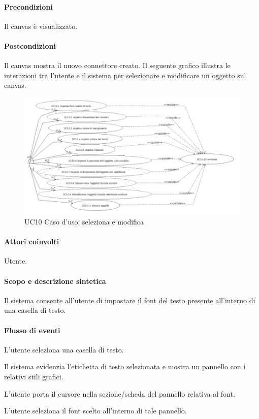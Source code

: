 \paragraph{Precondizioni} Il canvas \`e visualizzato.
\paragraph{Postcondizioni} Il canvas mostra il nuovo connettore creato.
\newpage
{}
\label{ucselezionaemodifica}
Il seguente grafico illustra le interazioni tra l'utente e il sistema per selezionare e modificare un oggetto sul canvas.

\begin{figure}[!ht]
\centering
\vspace{20pt} 
\includegraphics{UC10Espanso}
\caption{UC10 Caso d'uso: seleziona e modifica}
\label{uc10}
\end{figure}
\newpage
{}
\paragraph{Attori coinvolti} Utente.
\paragraph{Scopo e descrizione sintetica} 
Il sistema consente all'utente di impostare il font del testo presente all'interno di una casella di testo.
\paragraph{Flusso di eventi}
\begin{elenconumerato}[\textbf{}]{\subsubsecindent}
\item L'utente seleziona una casella di testo.
\item Il sistema evidenzia l'etichetta di testo selezionata e mostra un pannello con i relativi stili grafici.
\item L'utente porta il cursore nella sezione/scheda del pannello relativa al font.
\item L'utente seleziona il font scelto all'interno di tale pannello.
\end{elenconumerato}
